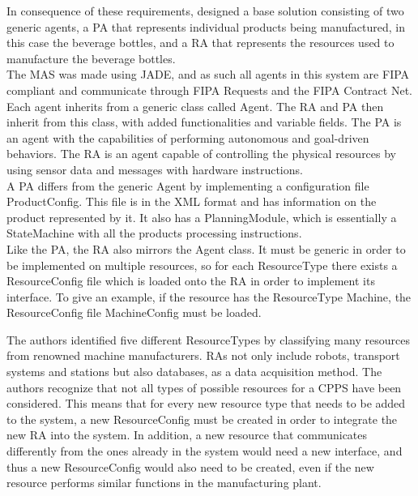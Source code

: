 In consequence of these requirements, \citeauthor{bottling_plant_part1} designed a base solution consisting of two generic agents, a \gls{PA} that represents individual products being manufactured, in this case the beverage bottles, and a \gls{RA} that represents the resources used to manufacture the beverage bottles.\\

The \gls{MAS} was made using JADE, and as such all agents in this system are \gls{FIPA} compliant and communicate through \gls{FIPA} Requests and the \gls{FIPA} Contract Net.\\

Each agent inherits from a generic class called Agent. The \gls{RA} and \gls{PA} then inherit from this class, with added functionalities and variable fields. The \gls{PA} is an agent with the capabilities of performing autonomous and goal-driven behaviors. The \gls{RA} is an agent capable of controlling the physical resources by using sensor data and messages with hardware instructions.\\

A \gls{PA} differs from the generic Agent by implementing a configuration file ProductConfig. This file is in the \gls{XML} format and has information on the product represented by it. It also has a PlanningModule, which is essentially a StateMachine with all the products processing instructions.\\

Like the \gls{PA}, the \gls{RA} also mirrors the Agent class. It must be generic in order to be implemented on multiple resources, so for each ResourceType there exists a ResourceConfig file which is loaded onto the \gls{RA} in order to implement its interface. To give an example, if the resource has the ResourceType Machine, the ResourceConfig file MachineConfig must be loaded.

The authors identified five different ResourceTypes by classifying many resources from renowned machine manufacturers. \gls{RA}s not only include robots, transport systems and stations but also databases, as a data acquisition method. The authors recognize that not all types of possible resources for a \gls{CPPS} have been considered. This means that for every new resource type that needs to be added to the system, a new ResourceConfig must be created in order to integrate the new \gls{RA} into the system. In addition, a new resource that communicates differently from the ones already in the system would need a new interface, and thus a new ResourceConfig would also need to be created, even if the new resource performs similar functions in the manufacturing plant.\\

